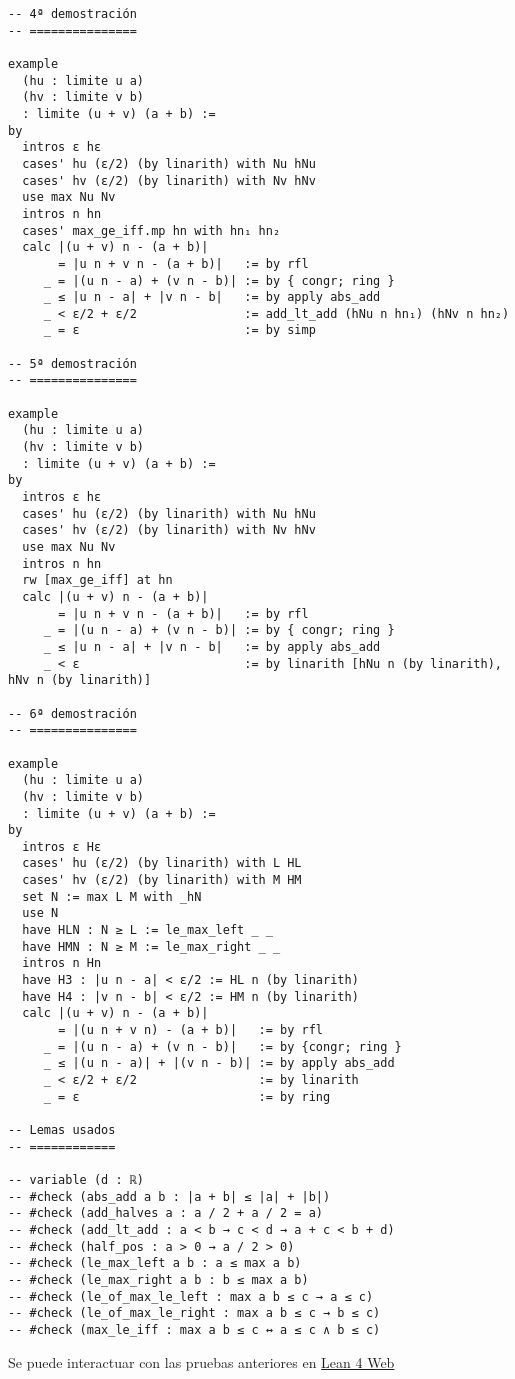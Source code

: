 \begin{verbatim}
-- 4ª demostración
-- ===============

example
  (hu : limite u a)
  (hv : limite v b)
  : limite (u + v) (a + b) :=
by
  intros ε hε
  cases' hu (ε/2) (by linarith) with Nu hNu
  cases' hv (ε/2) (by linarith) with Nv hNv
  use max Nu Nv
  intros n hn
  cases' max_ge_iff.mp hn with hn₁ hn₂
  calc |(u + v) n - (a + b)|
       = |u n + v n - (a + b)|   := by rfl
     _ = |(u n - a) + (v n - b)| := by { congr; ring }
     _ ≤ |u n - a| + |v n - b|   := by apply abs_add
     _ < ε/2 + ε/2               := add_lt_add (hNu n hn₁) (hNv n hn₂)
     _ = ε                       := by simp

-- 5ª demostración
-- ===============

example
  (hu : limite u a)
  (hv : limite v b)
  : limite (u + v) (a + b) :=
by
  intros ε hε
  cases' hu (ε/2) (by linarith) with Nu hNu
  cases' hv (ε/2) (by linarith) with Nv hNv
  use max Nu Nv
  intros n hn
  rw [max_ge_iff] at hn
  calc |(u + v) n - (a + b)|
       = |u n + v n - (a + b)|   := by rfl
     _ = |(u n - a) + (v n - b)| := by { congr; ring }
     _ ≤ |u n - a| + |v n - b|   := by apply abs_add
     _ < ε                       := by linarith [hNu n (by linarith), hNv n (by linarith)]

-- 6ª demostración
-- ===============

example
  (hu : limite u a)
  (hv : limite v b)
  : limite (u + v) (a + b) :=
by
  intros ε Hε
  cases' hu (ε/2) (by linarith) with L HL
  cases' hv (ε/2) (by linarith) with M HM
  set N := max L M with _hN
  use N
  have HLN : N ≥ L := le_max_left _ _
  have HMN : N ≥ M := le_max_right _ _
  intros n Hn
  have H3 : |u n - a| < ε/2 := HL n (by linarith)
  have H4 : |v n - b| < ε/2 := HM n (by linarith)
  calc |(u + v) n - (a + b)|
       = |(u n + v n) - (a + b)|   := by rfl
     _ = |(u n - a) + (v n - b)|   := by {congr; ring }
     _ ≤ |(u n - a)| + |(v n - b)| := by apply abs_add
     _ < ε/2 + ε/2                 := by linarith
     _ = ε                         := by ring

-- Lemas usados
-- ============

-- variable (d : ℝ)
-- #check (abs_add a b : |a + b| ≤ |a| + |b|)
-- #check (add_halves a : a / 2 + a / 2 = a)
-- #check (add_lt_add : a < b → c < d → a + c < b + d)
-- #check (half_pos : a > 0 → a / 2 > 0)
-- #check (le_max_left a b : a ≤ max a b)
-- #check (le_max_right a b : b ≤ max a b)
-- #check (le_of_max_le_left : max a b ≤ c → a ≤ c)
-- #check (le_of_max_le_right : max a b ≤ c → b ≤ c)
-- #check (max_le_iff : max a b ≤ c ↔ a ≤ c ∧ b ≤ c)
\end{verbatim}
Se puede interactuar con las pruebas anteriores en \href{https://lean.math.hhu.de/\#url=https://raw.githubusercontent.com/jaalonso/Calculemus2/main/src/Convergencia\_de\_la\_suma.lean}{Lean 4 Web}

